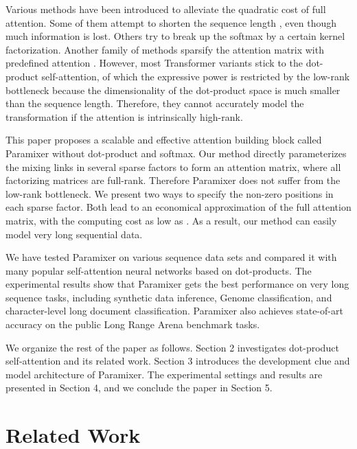 \documentclass{article}
\begin{document}
Various methods have been introduced to alleviate the quadratic cost of full attention. Some of them attempt to shorten the sequence length \cite{linformer, enformer}, even though much information is lost. Others try to break up the softmax by a certain kernel factorization.  Another family of methods sparsify the attention matrix with predefined attention \cite{beltagy2020longformer,zaheer2020big,ainslie2020etc,child2019generating,tay2019lightweight}. However, most Transformer variants stick to the dot-product self-attention, of which the expressive power is restricted by the low-rank bottleneck \cite{mhabottleneck} because the dimensionality of the dot-product space is much smaller than the sequence length. Therefore, they cannot accurately model the transformation if the attention is intrinsically high-rank.



This paper proposes a scalable and effective attention building block called Paramixer without dot-product and softmax. Our method directly parameterizes the mixing links in several sparse factors to form an attention matrix, where all factorizing matrices are full-rank. Therefore Paramixer does not suffer from the low-rank bottleneck. We present two ways to specify the non-zero positions in each sparse factor. Both lead to an economical approximation of the full attention matrix, with the computing cost as low as . As a result, our method can easily model very long sequential data.

We have tested Paramixer on various sequence data sets and compared it with many popular self-attention neural networks based on dot-products. The experimental results show that Paramixer gets the best performance on very long sequence tasks, including synthetic data inference, Genome classification, and character-level long document classification. Paramixer also achieves state-of-art accuracy on the public Long Range Arena benchmark tasks.

We organize the rest of the paper as follows. Section 2 investigates dot-product self-attention and its related work. Section 3 introduces the development clue and model architecture of Paramixer. The experimental settings and results are presented in Section 4, and we conclude the paper in Section 5.

\section{Related Work}
\label{sec:relwork}
\end{document}
